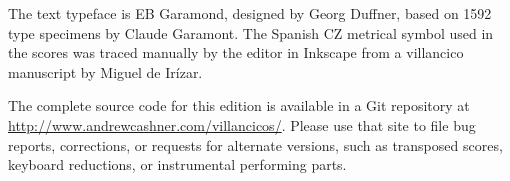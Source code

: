 The text typeface is EB Garamond, designed by Georg Duffner, based on 1592 type 
specimens by Claude Garamont.
The Spanish CZ metrical symbol used in the scores was traced manually by the
editor in Inkscape from a villancico manuscript by Miguel de Irízar.

The complete source code for this edition is available in a Git repository at
\url{http://www.andrewcashner.com/villancicos/}.
Please use that site to file bug reports, corrections, or requests for alternate
versions, such as transposed scores, keyboard reductions, or instrumental
performing parts.


